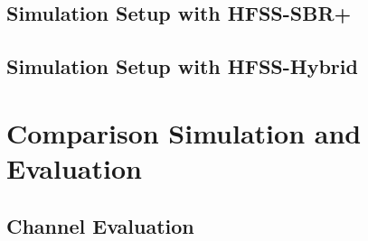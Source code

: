     \subsection{Simulation Setup with HFSS-SBR+}
    \subsection{Simulation Setup with HFSS-Hybrid}
\section{Comparison Simulation and Evaluation}
    \subsection{Channel Evaluation}







